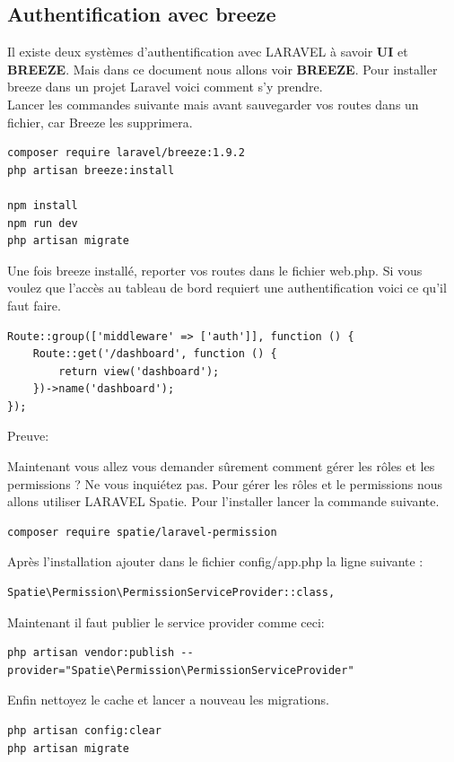 \documentclass[12pt,a4paper]{article}
\begin{document}
\subsection{Authentification avec breeze}
Il existe deux systèmes d'authentification avec LARAVEL à savoir \textbf{UI} et \textbf{BREEZE}. Mais dans ce document nous allons voir \textbf{BREEZE}. Pour installer
breeze dans un projet Laravel voici comment s'y prendre.\\
Lancer les commandes suivante mais avant sauvegarder vos routes dans un fichier, car Breeze les supprimera.

\begin{verbatim}
composer require laravel/breeze:1.9.2
php artisan breeze:install
 
npm install
npm run dev
php artisan migrate
\end{verbatim}

Une fois breeze installé, reporter vos routes dans le fichier web.php.
Si vous voulez que l'accès au tableau de bord requiert une authentification voici ce qu'il faut faire.
\begin{verbatim}
Route::group(['middleware' => ['auth']], function () {
    Route::get('/dashboard', function () {
        return view('dashboard');
    })->name('dashboard');
});
\end{verbatim}

Preuve:

Maintenant vous allez vous demander sûrement comment gérer les rôles et les permissions ?
Ne vous inquiétez pas. Pour gérer les rôles et le permissions nous allons utiliser LARAVEL Spatie. Pour l'installer lancer la commande suivante.

\begin{verbatim}
composer require spatie/laravel-permission
\end{verbatim}

Après l'installation ajouter dans le fichier config/app.php la ligne suivante :
\begin{verbatim}
Spatie\Permission\PermissionServiceProvider::class,
\end{verbatim}

Maintenant il faut publier le service provider comme ceci:
\begin{verbatim}
php artisan vendor:publish --provider="Spatie\Permission\PermissionServiceProvider"
\end{verbatim}

Enfin nettoyez le cache et lancer a nouveau les migrations.
\begin{verbatim}
php artisan config:clear
php artisan migrate
\end{verbatim}
\end{document}

